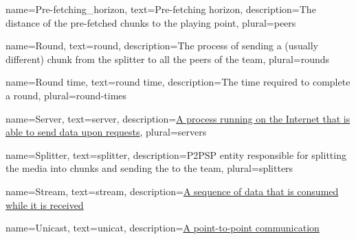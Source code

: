  {
    name={Pre-fetching_horizon},
    text={Pre-fetching horizon},
    description={The distance of the pre-fetched chunks to the playing point},
    plural={peers}
}

 {
    name={Round},
    text={round},
    description={The process of sending a (usually different) chunk from the splitter to all the peers of the team},
    plural={rounds}
}

 {
    name={Round time},
    text={round time},
    description={The time required to complete a round},
    plural={round-times}
}

 {
    name={Server},
    text={server},
    description={\href{https://en.wikipedia.org/wiki/Server_(computing)}{A process running on the Internet that is able to send data upon requests}},
    plural={servers}
}

 {
    name={Splitter},
    text={splitter},
    description={P2PSP entity responsible for splitting the \gls{media} into chunks and sending the to the team},
    plural={splitters}
}

 {
    name={Stream},
    text={stream},
    description={\href{https://en.wikipedia.org/wiki/Streaming_media}{A sequence of data that is consumed while it is received}}
}



 {
    name={Unicast},
    text={unicat},
    description={\href{https://en.wikipedia.org/wiki/Unicast}{A point-to-point communication}}
}

